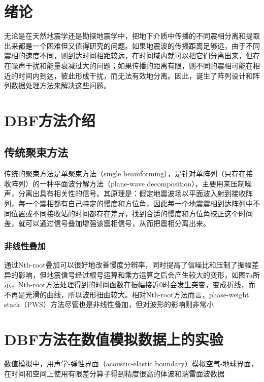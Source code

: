 \documentclass[a4paper,12pt,openany,UTF8]{ctexbook}
\begin{document}

\chapter{绪论}
无论是在天然地震学还是勘探地震学中，把地下介质中传播的不同震相分离和提取出来都是一个困难但又值得研究的问题。如果地震波的传播距离足够远，由于不同震相的速度不同，则到达时间相距较远，在时间域内就可以把它们分离出来，但存在噪声干扰和能量衰减过大的问题；如果传播的距离有限，则不同的震相可能在相近的时间内到达，彼此形成干扰，而无法有效地分离。因此，诞生了阵列设计和阵列数据处理方法来解决这些问题。
\chapter{DBF方法介绍}
	\section{传统聚束方法}
传统的聚束方法是单聚束方法（single beamforming），是针对单阵列（只存在接收阵列）的一种平面波分解方法（plane-wave decomposition），主要用来压制噪声，分离出具有相关性的信号。其原理是：假定地震波场以平面波入射到接收阵列，每一个震相都有自己特定的慢度和方位角，因此每一个地震震相到达阵列中不同位置或不同接收站的时间都存在差异，找到合适的慢度和方位角校正这个时间差，就可以通过信号叠加增强该震相信号，从而把震相分离出来。
	\subsection{非线性叠加}
通过Nth-root叠加可以很好地改善慢度分辨率，同时提高了信噪比和压制了振幅差异的影响，但地震信号经过根号运算和乘方运算之后会产生较大的变形，如图7a所示，Nth-root方法处理得到的时间函数在振幅接近0时会发生突变，变成折线，而不再是光滑的曲线，所以波形扭曲较大。相对Nth-root方法而言，phase-weight stack（PWS）方法尽管也是非线性叠加，但对波形的影响则非常小
\chapter{DBF方法在数值模拟数据上的实验}
数值模拟中，用声学-弹性界面（acoustic-elastic boundary）模拟空气-地球界面，在时间和空间上使用有限差分算子得到精度很高的体波和瑞雷面波数据


%


\end{document}
